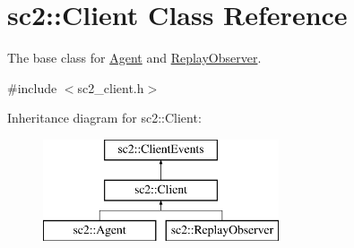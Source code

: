 \hypertarget{classsc2_1_1_client}{}\section{sc2\+:\+:Client Class Reference}
\label{classsc2_1_1_client}


The base class for \hyperlink{classsc2_1_1_agent}{Agent} and \hyperlink{classsc2_1_1_replay_observer}{Replay\+Observer}.  




{\ttfamily \#include $<$sc2\+\_\+client.\+h$>$}

Inheritance diagram for sc2\+:\+:Client\+:\begin{figure}[H]
\begin{center}
\leavevmode
\includegraphics[height=3.000000cm]{classsc2_1_1_client}
\end{center}
\end{figure}
